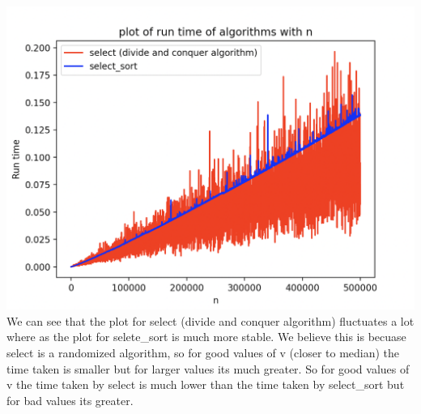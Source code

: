 \documentclass[a4paper]{exam}
\begin{document}
\begin{questions}
	\begin{solution}
    \\\includegraphics[scale = 0.5]{plot(100,500000,100).png}
    We can see that the plot for select (divide and conquer algorithm) fluctuates a lot where as the plot for selete\_sort is much more stable.
    We believe this is becuase select is a randomized algorithm, so for good values of v (closer to median) the time taken is smaller but for larger values its much greater.
    So for good values of v the time taken by select is much lower than the time taken by select\_sort but for bad values its greater.
	\end{solution}

\end{questions}
\end{document}
